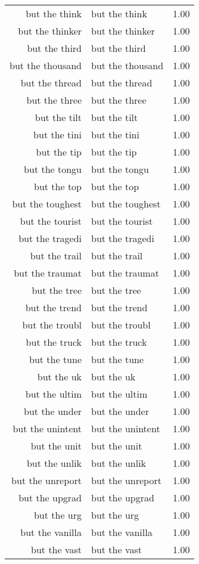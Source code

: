 \begin{table}[ht]
\begin{tabular}{rlr}
  but the think & but the think & 1.00 \\ 
  but the thinker & but the thinker & 1.00 \\ 
  but the third & but the third & 1.00 \\ 
  but the thousand & but the thousand & 1.00 \\ 
  but the thread & but the thread & 1.00 \\ 
  but the three & but the three & 1.00 \\ 
  but the tilt & but the tilt & 1.00 \\ 
  but the tini & but the tini & 1.00 \\ 
  but the tip & but the tip & 1.00 \\ 
  but the tongu & but the tongu & 1.00 \\ 
  but the top & but the top & 1.00 \\ 
  but the toughest & but the toughest & 1.00 \\ 
  but the tourist & but the tourist & 1.00 \\ 
  but the tragedi & but the tragedi & 1.00 \\ 
  but the trail & but the trail & 1.00 \\ 
  but the traumat & but the traumat & 1.00 \\ 
  but the tree & but the tree & 1.00 \\ 
  but the trend & but the trend & 1.00 \\ 
  but the troubl & but the troubl & 1.00 \\ 
  but the truck & but the truck & 1.00 \\ 
  but the tune & but the tune & 1.00 \\ 
  but the uk & but the uk & 1.00 \\ 
  but the ultim & but the ultim & 1.00 \\ 
  but the under & but the under & 1.00 \\ 
  but the unintent & but the unintent & 1.00 \\ 
  but the unit & but the unit & 1.00 \\ 
  but the unlik & but the unlik & 1.00 \\ 
  but the unreport & but the unreport & 1.00 \\ 
  but the upgrad & but the upgrad & 1.00 \\ 
  but the urg & but the urg & 1.00 \\ 
  but the vanilla & but the vanilla & 1.00 \\ 
  but the vast & but the vast & 1.00 \\ 

\end{tabular}
\end{table}
